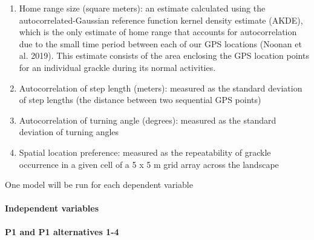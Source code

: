 \documentclass[
]{article}
\begin{document}
\begin{enumerate}
\def\labelenumi{\arabic{enumi})}
\item
  Home range size (square meters): an estimate calculated using the
  autocorrelated-Gaussian reference function kernel density estimate
  (AKDE), which is the only estimate of home range that accounts for
  autocorrelation due to the small time period between each of our GPS
  locations (Noonan et al. 2019). This estimate consists of the area
  enclosing the GPS location points for an individual grackle during its
  normal activities.
\item
  Autocorrelation of step length (meters): measured as the standard
  deviation of step lengths (the distance between two sequential GPS
  points)
\item
  Autocorrelation of turning angle (degrees): measured as the standard
  deviation of turning angles
\item
  Spatial location preference: measured as the repeatability of grackle
  occurrence in a given cell of a 5 x 5 m grid array across the
  landscape
\end{enumerate}

One model will be run for each dependent variable

\hypertarget{independent-variables}{%
\paragraph{Independent variables}\label{independent-variables}}

\textbf{P1 and P1 alternatives 1-4}
\end{document}
